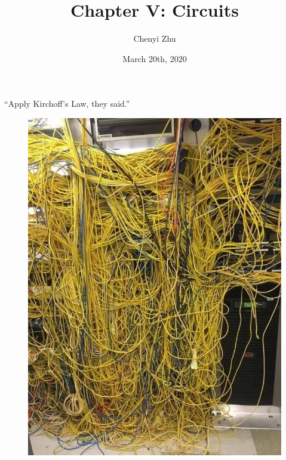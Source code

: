 \documentclass[11pt, letterpaper]{article}
\title{Chapter V: Circuits}
\author{Chenyi Zhu}
\date{March 20th, 2020}
\begin{document}
\begin{titlingpage}
	\maketitle
	
	\begin{center}
		``Apply Kirchoff's Law, they said.''
	\end{center}
	
	\begin{figure}[h!]
		\centering
		\includegraphics[scale=0.4]{loops}
		\label{fig:flux}
	\end{figure}
		
\end{titlingpage}
	
\end{document}
